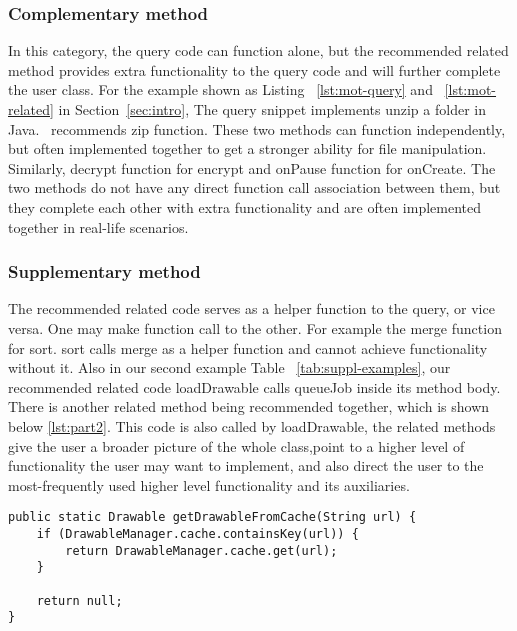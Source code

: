 	

\subsubsection{Complementary method} In this category, the query code can function alone, but the recommended related method provides extra functionality to the query code and will further complete the user class. For the example shown as Listing ~\ref{lst:mot-query} and ~\ref{lst:mot-related} in Section~\ref{sec:intro}, The query snippet implements unzip a folder in Java.  \tool\ recommends {\ttt zip} function. These two methods can function independently, but often implemented together to get a stronger ability for file manipulation. Similarly, {\ttt decrypt} function for {\ttt encrypt} and {\ttt onPause} function for {\ttt onCreate}. The two methods do not have any direct function call association between them, but they complete each other with extra functionality and are often implemented together in real-life scenarios. 

\subsubsection{Supplementary method} The recommended related code serves as a helper function to the query, or vice versa. One may make function call to the other. For example the {\ttt merge} function for {\ttt sort}. {\ttt sort} calls {\ttt merge} as a helper function and cannot achieve functionality without it. Also in our second example Table ~\ref{tab:suppl-examples}, our recommended related code {\ttt loadDrawable} calls {\ttt queueJob} inside its method body. There is another related method being recommended together, which is shown below \ref{lst:part2}. This code is also called by {\ttt loadDrawable}, the related methods give the user a broader picture of the whole class,point to a higher level of functionality the user may want to implement, and also direct the user to the most-frequently used higher level functionality and its auxiliaries.
\begin{lstlisting}[caption={Recommended code \#2}, label={lst:part2}]
public static Drawable getDrawableFromCache(String url) {
	if (DrawableManager.cache.containsKey(url)) {
		return DrawableManager.cache.get(url);
	}
	
	return null;
}	
\end{lstlisting}

